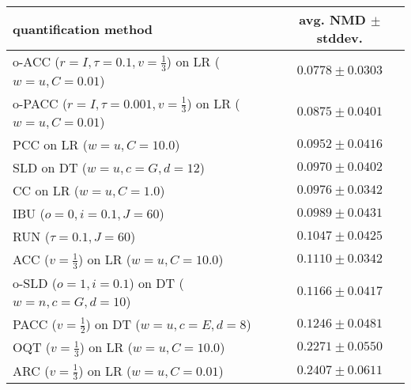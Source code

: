 \begin{tabular}{lc}
  \toprule
  quantification method & avg. NMD $\pm$ stddev. \\
  \midrule
  o-ACC ($r=I, \tau=0.1, v=\frac{1}{3}$) on LR ($w=u, C=0.01$) & $\mathbf{0.0778 \pm 0.0303}$ \\
  o-PACC ($r=I, \tau=0.001, v=\frac{1}{3}$) on LR ($w=u, C=0.01$) & $0.0875 \pm 0.0401$ \\
  PCC on LR ($w=u, C=10.0$) & $0.0952 \pm 0.0416$ \\
  SLD on DT ($w=u, c=G, d=12$) & $0.0970 \pm 0.0402$ \\
  CC on LR ($w=u, C=1.0$) & $0.0976 \pm 0.0342$ \\
  IBU ($o=0, i=0.1, J=60$) & $0.0989 \pm 0.0431$ \\
  RUN ($\tau=0.1, J=60$) & $0.1047 \pm 0.0425$ \\
  ACC ($v=\frac{1}{3}$) on LR ($w=u, C=10.0$) & $0.1110 \pm 0.0342$ \\
  o-SLD ($o=1, i=0.1$) on DT ($w=n, c=G, d=10$) & $0.1166 \pm 0.0417$ \\
  PACC ($v=\frac{1}{2}$) on DT ($w=u, c=E, d=8$) & $0.1246 \pm 0.0481$ \\
  OQT ($v=\frac{1}{3}$) on LR ($w=u, C=10.0$) & $0.2271 \pm 0.0550$ \\
  ARC ($v=\frac{1}{3}$) on LR ($w=u, C=0.01$) & $0.2407 \pm 0.0611$ \\
  \bottomrule
\end{tabular}
